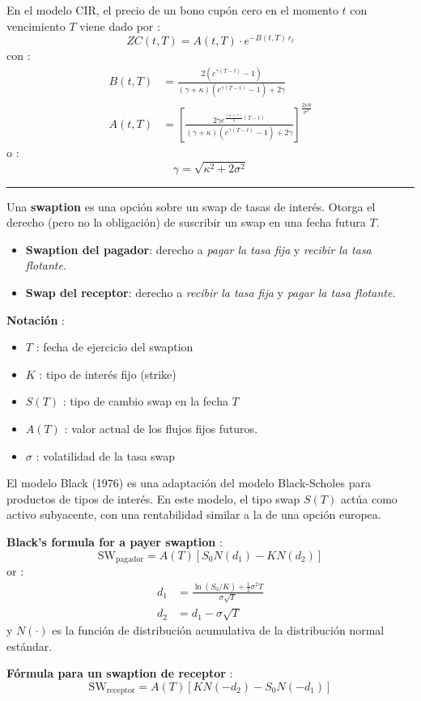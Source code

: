 \begin{f}
En el modelo CIR, el precio de un bono cupón cero en el momento \(t\) con vencimiento \(T\) viene dado por :
\[
ZC(t, T) = A(t, T) \cdot e^{-B(t, T)\, r_t}
\]
con :
\[
\begin{aligned}
	B(t, T) &= \frac{2 (e^{\gamma (T - t)} - 1)}{(\gamma + \kappa)(e^{\gamma (T - t)} - 1) + 2\gamma} \\
	A(t, T) &= \left[ \frac{2\gamma e^{\frac{(\kappa + \gamma)}{2}(T - t)}}{(\gamma + \kappa)(e^{\gamma (T - t)} - 1) + 2\gamma} \right]^{\frac{2\kappa\theta}{\sigma^2}}
\end{aligned}
\]
o :
\[
\gamma = \sqrt{\kappa^2 + 2\sigma^2}
\]

\end{f}
\hrule

\begin{f}

Una \textbf{swaption} es una opción sobre un swap de tasas de interés. Otorga el derecho (pero no la obligación) de suscribir un swap en una fecha futura \(T\).

\begin{itemize}[nosep]
	\item \textbf{Swaption del pagador}: derecho a \emph{pagar la tasa fija} y \emph{recibir la tasa flotante}.
	\item \textbf{Swap del receptor}: derecho a \emph{recibir la tasa fija} y \emph{pagar la tasa flotante}.
\end{itemize}

\textbf{Notación} :
\begin{itemize}[nosep]
	\item \(T\) : fecha de ejercicio del swaption
	\item \(K\) : tipo de interés fijo (strike)
	\item \(S(T)\) : tipo de cambio swap en la fecha \(T\)
	\item \(A(T)\) : valor actual de los flujos fijos futuros.
	\item \(\sigma\) : volatilidad de la tasa swap
\end{itemize}

El modelo Black (1976) es una adaptación del modelo Black-Scholes para productos de tipos de interés. En este modelo, el tipo swap \(S(T)\) actúa como activo subyacente, con una rentabilidad similar a la de una opción europea.

\textbf{Black's formula for a payer swaption} :
\[
\text{SW}_{\text{pagador}} = A(T) \left[ S_0 N(d_1) - K N(d_2) \right]
\]
or :
\[
\begin{aligned}
	d_1 &= \frac{\ln(S_0 / K) + \frac{1}{2} \sigma^2 T}{\sigma \sqrt{T}} \\
	d_2 &= d_1 - \sigma \sqrt{T}
\end{aligned}
\]
y \(N(\cdot)\) es la función de distribución acumulativa de la distribución normal estándar.

\textbf{Fórmula para un swaption de receptor} :
\[
\text{SW}_{\text{receptor}} = A(T) \left[ K N(-d_2) - S_0 N(-d_1) \right]
\]

\end{f}

